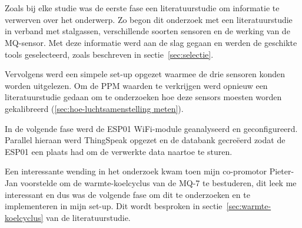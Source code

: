 
\chapter{}%
\label{ch:methodologie}


Zoals bij elke studie was de eerste fase een literatuurstudie om informatie te verwerven over het onderwerp. Zo begon dit onderzoek met een literatuurstudie in verband met stalgassen, verschillende soorten sensoren en de werking van de MQ-sensor. Met deze informatie werd aan de slag gegaan en werden de geschikte tools geselecteerd, zoals beschreven in sectie~\ref{sec:selectie}.

Vervolgens werd een simpele set-up opgezet waarmee de drie sensoren konden worden uitgelezen. Om de PPM waarden te verkrijgen werd opnieuw een literatuurstudie gedaan om te onderzoeken hoe deze sensors moesten worden gekalibreerd (\ref{sec:hoe-luchtsamenstelling meten}).

In de volgende fase werd de ESP01 WiFi-module geanalyseerd en geconfigureerd. Parallel hieraan werd ThingSpeak opgezet en de databank gecreëerd zodat de ESP01 een plaats had om de verwerkte data naartoe te sturen.

Een interessante wending in het onderzoek kwam toen mijn co-promotor Pieter-Jan voorstelde om de warmte-koelcyclus van de MQ-7 te bestuderen, dit leek me interessant en dus was de volgende fase om dit te onderzoeken en te implementeren in mijn set-up. Dit wordt besproken in sectie~\ref{sec:warmte-koelcyclus} van de literatuurstudie.

